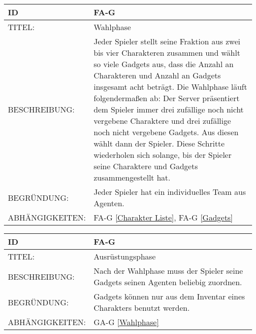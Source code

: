 \begin{tabularx}{16cm}{l|X}
	{table}\label{Wahlphase}
	\textbf{ID} & \textbf{FA-G \arabic{table}} \\
	\hline
	TITEL: & Wahlphase \\
	\hline
	BESCHREIBUNG: & Jeder Spieler stellt seine Fraktion aus zwei bis vier Charakteren zusammen und wählt so viele Gadgets aus, dass die Anzahl an Charakteren und Anzahl an Gadgets insgesamt acht beträgt.
	\newline Die Wahlphase läuft folgendermaßen ab: Der Server präsentiert dem Spieler immer drei zufällige noch nicht vergebene Charaktere und drei zufällige noch nicht vergebene Gadgets. Aus diesen wählt dann der Spieler.
	\newline Diese Schritte wiederholen sich solange, bis der Spieler seine Charaktere und Gadgets zusammengestellt hat.\\
	\hline
	BEGRÜNDUNG: & Jeder Spieler hat ein individuelles Team aus Agenten. \\
	\hline
	ABHÄNGIGKEITEN: &  FA-G \ref{Charakter Liste}, FA-G \ref{Gadgets}\\
\end{tabularx}

\begin{tabularx}{16cm}{l|X}
	{table}\label{Ausruestungsphase}
	\textbf{ID} & \textbf{FA-G \arabic{table}} \\
	\hline
	TITEL: & Ausrüstungsphase \\
	\hline
	BESCHREIBUNG: & Nach der Wahlphase muss der Spieler seine Gadgets seinen Agenten beliebig zuordnen.\\
	\hline
	BEGRÜNDUNG: & Gadgets können nur aus dem Inventar eines Charakters benutzt werden. \\
	\hline
	ABHÄNGIGKEITEN: & GA-G \ref{Wahlphase} \\
\end{tabularx}


